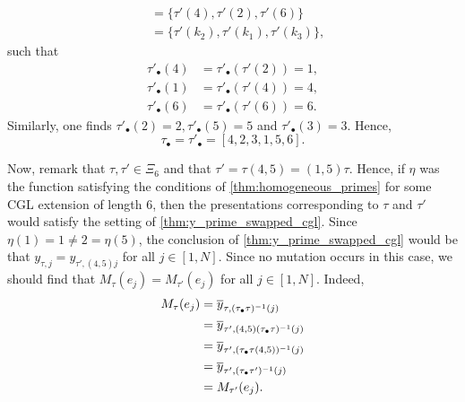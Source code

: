 \begin{example}
\begin{align*}
		            & = \{\tau'(4), \tau'(2), \tau'(6)\}        \\
		            & = \{\tau'(k_2), \tau'(k_1), \tau'(k_3)\},
	\end{align*}
	such that
	\begin{align*}
		\tau'_\bullet(4) & = \tau'_\bullet(\tau'(2)) = 1, \\
		\tau'_\bullet(1) & = \tau'_\bullet(\tau'(4)) = 4, \\
		\tau'_\bullet(6) & = \tau'_\bullet(\tau'(6)) = 6.
	\end{align*}
	Similarly, one finds $\tau'_\bullet(2) = 2, \tau'_\bullet(5) = 5$ and $\tau'_\bullet(3)
		= 3$. Hence,
	\begin{equation*}
		\tau_\bullet = \tau'_\bullet = [4,2,3,1,5,6].
	\end{equation*}

	Now, remark that $\tau, \tau' \in \Xi_6$ and that $\tau' = \tau (4, 5) = (1,5) \tau$.
	Hence, if $\eta$ was the function satisfying the conditions of
	\cref{thm:homogeneous_primes} for some CGL extension of length 6, then the
	presentations corresponding to $\tau$ and $\tau'$ would satisfy the setting of
	\cref{thm:y_prime_swapped_cgl}. Since $\eta(1) = 1 \neq 2 = \eta(5)$, the conclusion of
	\cref{thm:y_prime_swapped_cgl} would be that $y_{\tau, j} = y_{\tau', (4,5)j}$ for all
	$j \in [1, N]$. Since no mutation occurs in this case, we should find that $M_\tau
		(e_j) = M_{\tau'}(e_j)$ for all $j \in [1, N]$. Indeed,
	\begin{align*}
		M_{\tau}(e_j)
		 & = \overline{y}_{\tau, (\tau_\bullet \tau)^{-1} (j)}        \\
		 & = \overline{y}_{\tau', (4,5)(\tau_\bullet \tau)^{-1} (j)}  \\
		 & = \overline{y}_{\tau', (\tau_\bullet \tau (4,5))^{-1} (j)} \\
		 & = \overline{y}_{\tau', (\tau_\bullet \tau')^{-1} (j)}      \\
		 & = M_{\tau'}(e_j).
	\end{align*}
\end{example}
